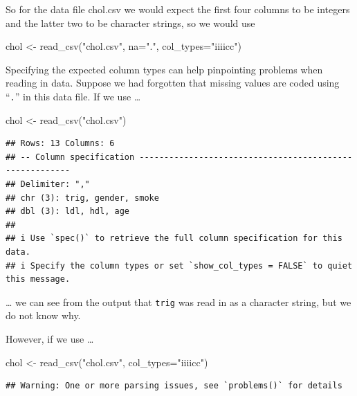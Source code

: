 \documentclass[
]{book}
\newenvironment{Shaded}{\begin{snugshade}}{\end{snugshade}}
\newcommand{\AttributeTok}[1]{\textcolor[rgb]{0.77,0.63,0.00}{#1}}
\newcommand{\FunctionTok}[1]{\textcolor[rgb]{0.00,0.00,0.00}{#1}}
\newcommand{\NormalTok}[1]{#1}
\newcommand{\OtherTok}[1]{\textcolor[rgb]{0.56,0.35,0.01}{#1}}
\newcommand{\StringTok}[1]{\textcolor[rgb]{0.31,0.60,0.02}{#1}}
\begin{document}
So for the data file chol.csv we would expect the first four columns to be integers and the latter two to be character strings, so we would use

\begin{Shaded}
\begin{Highlighting}[]
\NormalTok{chol }\OtherTok{\textless{}{-}} \FunctionTok{read\_csv}\NormalTok{(}\StringTok{"chol.csv"}\NormalTok{, }\AttributeTok{na=}\StringTok{"."}\NormalTok{, }\AttributeTok{col\_types=}\StringTok{"iiiicc"}\NormalTok{)}
\end{Highlighting}
\end{Shaded}

Specifying the expected column types can help pinpointing problems when reading in data. Suppose we had forgotten that missing values are coded using ``\texttt{.}'' in this data file. If we use \ldots{}

\begin{Shaded}
\begin{Highlighting}[]
\NormalTok{chol }\OtherTok{\textless{}{-}} \FunctionTok{read\_csv}\NormalTok{(}\StringTok{"chol.csv"}\NormalTok{)}
\end{Highlighting}
\end{Shaded}

\begin{verbatim}
## Rows: 13 Columns: 6
## -- Column specification --------------------------------------------------------
## Delimiter: ","
## chr (3): trig, gender, smoke
## dbl (3): ldl, hdl, age
## 
## i Use `spec()` to retrieve the full column specification for this data.
## i Specify the column types or set `show_col_types = FALSE` to quiet this message.
\end{verbatim}

\ldots{} we can see from the output that \texttt{trig} was read in as a character string, but we do not know why.

However, if we use \ldots{}

\begin{Shaded}
\begin{Highlighting}[]
\NormalTok{chol }\OtherTok{\textless{}{-}} \FunctionTok{read\_csv}\NormalTok{(}\StringTok{"chol.csv"}\NormalTok{, }\AttributeTok{col\_types=}\StringTok{"iiiicc"}\NormalTok{)}
\end{Highlighting}
\end{Shaded}

\begin{verbatim}
## Warning: One or more parsing issues, see `problems()` for details
\end{verbatim}
\end{document}
